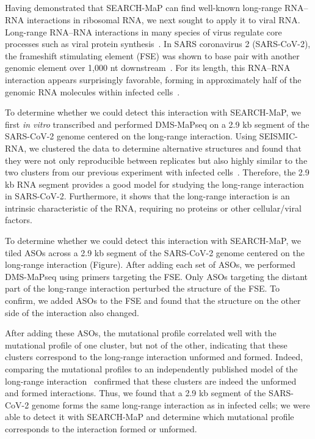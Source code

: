 \documentclass[main.tex]{subfiles}
\begin{document}
\subsection{}

Having demonstrated that SEARCH-MaP can find well-known long-range RNA--RNA interactions in ribosomal RNA, we next sought to apply it to viral RNA.
Long-range RNA--RNA interactions in many species of virus regulate core processes such as viral protein synthesis~\cite{Nicholson2014}.
In SARS coronavirus 2 (SARS-CoV-2), the frameshift stimulating element (FSE) was shown to base pair with another genomic element over 1,000 nt downstream~\cite{Ziv2020}.
For its length, this RNA--RNA interaction appears surprisingly favorable, forming in approximately half of the genomic RNA molecules within infected cells~\cite{Lan2022}.

To determine whether we could detect this interaction with SEARCH-MaP, we first \textit{in vitro} transcribed and performed DMS-MaPseq on a 2.9 kb segment of the SARS-CoV-2 genome centered on the long-range interaction.
Using SEISMIC-RNA, we clustered the data to determine alternative structures and found that they were not only reproducible between replicates but also highly similar to the two clusters from our previous experiment with infected cells~\cite{Lan2022}.
Therefore, the 2.9 kb RNA segment provides a good model for studying the long-range interaction in SARS-CoV-2.
Furthermore, it shows that the long-range interaction is an intrinsic characteristic of the RNA, requiring no proteins or other cellular/viral factors.

To determine whether we could detect this interaction with SEARCH-MaP, we tiled ASOs across a 2.9 kb segment of the SARS-CoV-2 genome centered on the long-range interaction (Figure).
After adding each set of ASOs, we performed DMS-MaPseq using primers targeting the FSE.
Only ASOs targeting the distant part of the long-range interaction perturbed the structure of the FSE.
To confirm, we added ASOs to the FSE and found that the structure on the other side of the interaction also changed.

After adding these ASOs, the mutational profile correlated well with the mutational profile of one cluster, but not of the other, indicating that these clusters correspond to the long-range interaction unformed and formed.
Indeed, comparing the mutational profiles to an independently published model of the long-range interaction~\cite{Ziv2020} confirmed that these clusters are indeed the unformed and formed interactions.
Thus, we found that a 2.9 kb segment of the SARS-CoV-2 genome forms the same long-range interaction as in infected cells; we were able to detect it with SEARCH-MaP and determine which mutational profile corresponds to the interaction formed or unformed.
\end{document}
